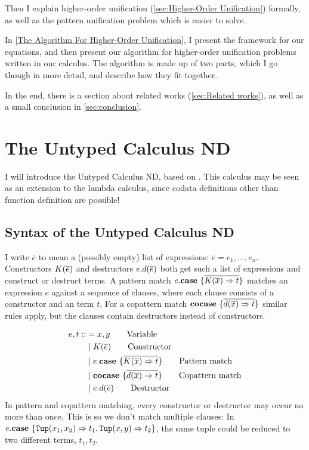 \documentclass[twoside,12pt,a4paper]{article}
\begin{document}
Then I explain higher-order unification (\cref{sec:Higher-Order Unification}) formally, as well as the pattern unification problem which is easier to solve.

In \cref{The Algorithm For Higher-Order Unification}, I present the framework for our equations, 
and then present our algorithm for higher-order unification problems written in our calculus.
The algorithm is made up of two parts, which I go though in more detail, and describe how they fit together.

In the end, there is a section about related works (\cref{sec:Related works}), as well as a small conclusion in \cref{sec:conclusion}.

\section{The Untyped Calculus ND}\label{sec:The Untyped Calculus ND}

I will introduce the Untyped Calculus ND, based on \cite{binder2024programming}.
This calculus may be seen as an extension to the lambda calculus,
since codata definitions other than function definition are possible!

\subsection{Syntax of the Untyped Calculus ND}\label{sec:syntax}

I write $\overline{e}$ to mean a (possibly empty) list of expressions: $\overline{e}= e_1, ..., e_n$.  
Constructors $K(\overline{e})$ and destructors $e.d(\overline{e})$ both get such a list of expressions and construct or destruct terms.
A pattern match $e.\textbf{case}\ \{\overline{K(\overline{x})\Rightarrow t}\}$ matches an expression $e$ against a sequence of clauses, where each clause consists of a constructor and an term $t$.
For a copattern match $\textbf{cocase}\ \{\overline{d(\overline{x})\Rightarrow t}\}$
similar rules apply, but the clauses contain destructors instead of constructors.

\begin{definition}
    \begin{align*}
    e,t ::&=  x,y  \tag*{Variable} \\
        &\;|\;K(\overline{e}) \tag*{Constructor} \\
        &\;|\;e.\textbf{case}\ \{\overline{K(\overline{x})\Rightarrow t}\}  \tag*{Pattern match}\\
        &\;|\;\textbf{cocase}\ \{\overline{d(\overline{x})\Rightarrow t}\}  \tag*{Copattern match}\\
        &\;|\;e.d(\overline{e})  \tag*{Destructor}
    \end{align*}
    In pattern and copattern matching, every constructor or destructor may occur no more than once.
    This is so we don't match multiple clauses:
    In $e.\textbf{case}\ \{\mathtt{Tup(}x_1, x_2\mathtt{)}\Rightarrow t_1, \mathtt{Tup(}x, y\mathtt{)}\Rightarrow t_2\}$, the same tuple could be reduced to two different terms, $t_1, t_2$.
\end{definition}
\end{document}
